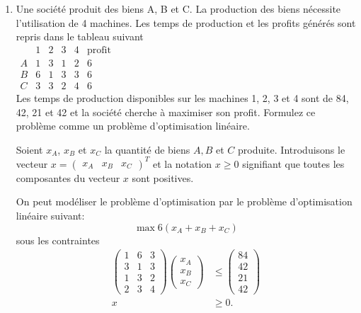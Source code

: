 \begin{enumerate}
  \item Une société produit des biens A, B et C. La production des biens nécessite l'utilisation de 4 machines. Les temps de production
    et les profits générés sont repris dans le tableau suivant\\

    $
    \begin{array}{l|llll|l}
      & 1 & 2 & 3 & 4 & \mbox{profit}\\
      \hline
      A & 1 & 3 & 1 & 2 & 6\\
      B & 6 & 1 & 3 & 3 & 6\\
      C & 3 & 3 & 2 & 4 & 6
    \end{array}
    $
    \\


    Les temps de production disponibles sur les machines 1, 2, 3 et 4  sont de 84, 42, 21 et 42 et la société cherche à  maximiser son
    profit. Formulez ce problème comme un problème d'optimisation linéaire.

    \begin{solution}
      Soient $x_{A}$, $x_{B}$ et $x_{C}$
      la quantité de biens $A, B$ et $C$ produite.
      Introduisons le vecteur
      \(
      x =
      \begin{pmatrix}
        x_A & x_B & x_C
      \end{pmatrix}^T
      \)
      et la notation $x \geq 0$ signifiant que toutes les composantes du vecteur $x$ sont positives.

      On peut modéliser le problème d'optimisation par le problème d'optimisation linéaire suivant:
      \[ \max 6(x_{A} + x_{B} + x_{C}) \]
      sous les contraintes
      \begin{align*}
        \begin{pmatrix}
          1 & 6 & 3\\
          3 & 1 & 3\\
          1 & 3 & 2\\
          2 & 3 & 4
        \end{pmatrix}
        \begin{pmatrix}
          x_{A}\\
          x_{B}\\
          x_{C}
        \end{pmatrix}
        & \leq
        \begin{pmatrix}
          84\\
          42\\
          21\\
          42
        \end{pmatrix}\\
        x & \geq 0.
      \end{align*}
    \end{solution}



\end{enumerate}
